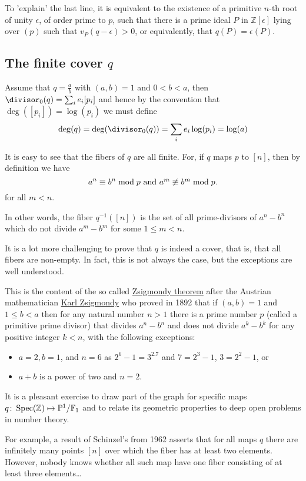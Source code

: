 To 'explain' the last line, it is equivalent to the existence of a primitive $n$-th root of unity $\epsilon$, of order prime to $p$, such that there is a prime ideal $P$ in $\mathbb{Z}[\epsilon]$ lying over $(p)$ such that $v_P(q-\epsilon) > 0$, or equivalently, that $q(P)=\epsilon(P)$.

\subsection{The finite cover $q$}

Assume that $q = \frac{a}{b}$ with $(a,b)=1$ and $0 < b < a$, then $\divisor_0(q) = \sum_i e_i [p_i]$ and hence by the convention that $\deg([p_i]) = \log(p_i)$ we must define
\begin{equation}
  \deg(q) = \deg(\divisor_0(q)) = \sum_i e_i \log(p_i) = \log(a)
\end{equation}

It is easy to see that the fibers of $q$ are all finite. For, if $q$ maps $p$ to $[n]$, then by definition we have
\begin{equation}
  a^n \equiv b^n\bmod p$ and $a^m \not\equiv b^m\bmod p.
\end{equation}
for all $m < n$.

In other words, the fiber $q^{-1}([n])$ is the set of all prime-divisors of $a^n-b^n$ which do not divide $a^m-b^m$ for some $1 \leq m < n$.

It is a lot more challenging to prove that $q$ is indeed a cover, that is, that all fibers are non-empty. In fact, this is not always the case, but the exceptions are well understood.

This is the content of the so called \href{http://en.wikipedia.org/wiki/Zsigmondy's_theorem}{Zsigmondy theorem} after the Austrian mathematician \href{http://en.wikipedia.org/wiki/Karl_Zsigmondy}{Karl Zsigmondy} who proved in 1892 that if $(a,b)=1$ and $1 \leq b < a$ then for any natural number $n > 1$ there is a prime number $p$ (called a primitive prime divisor) that divides $a^n-b^n$ and does not divide $a^k-b^k$ for any positive integer $k < n$, with the following exceptions:
\begin{itemize}
  \item $a = 2, b = 1$, and $n = 6$  as $2^6-1=3^2.7$ and $7=2^3-1$, $3=2^2-1$, or
  \item $a+b$ is a power of two and $n=2$.
\end{itemize}

It is a pleasant exercise to draw part of the graph for specific maps $q\colon\operatorname{Spec}(\mathbb{Z}) \mapsto \mathbb{P}^1 / \mathbb{F}_1$ and to relate its geometric properties to deep open problems in number theory.

For example, a result of Schinzel's from 1962 asserts that for all maps $q$ there are infinitely many points $[n]$ over which the fiber has at least two elements. However, nobody knows whether all such map have one fiber consisting of at least three elements\ldots
